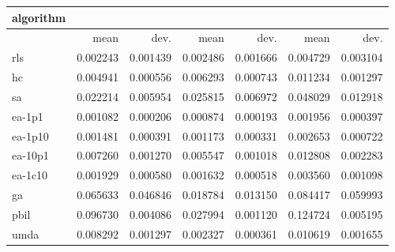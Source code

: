 \begin{tabular}{@{}l*{6}{>{{}}N{1}{2}}@{}}
\toprule
{algorithm} &  &  &  \\
\midrule
& {mean} & {dev.} & {mean} & {dev.} & {mean} & {dev.} \\
\midrule
rls & 0.002243 & 0.001439 & 0.002486 & 0.001666 & 0.004729 & 0.003104 \\
 hc & 0.004941 & 0.000556 & 0.006293 & 0.000743 & 0.011234 & 0.001297 \\
 sa & 0.022214 & 0.005954 & 0.025815 & 0.006972 & 0.048029 & 0.012918 \\
 ea-1p1 & 0.001082 & 0.000206 & 0.000874 & 0.000193 & 0.001956 & 0.000397 \\
 ea-1p10 & 0.001481 & 0.000391 & 0.001173 & 0.000331 & 0.002653 & 0.000722 \\
 ea-10p1 & 0.007260 & 0.001270 & 0.005547 & 0.001018 & 0.012808 & 0.002283 \\
 ea-1c10 & 0.001929 & 0.000580 & 0.001632 & 0.000518 & 0.003560 & 0.001098 \\
 ga & 0.065633 & 0.046846 & 0.018784 & 0.013150 & 0.084417 & 0.059993 \\
 pbil & 0.096730 & 0.004086 & 0.027994 & 0.001120 & 0.124724 & 0.005195 \\
 umda & 0.008292 & 0.001297 & 0.002327 & 0.000361 & 0.010619 & 0.001655 \\
 \bottomrule
\end{tabular}

